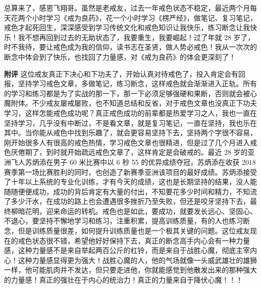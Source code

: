 \begin{case}
    总算来了，感恩飞翔哥。虽然是老戒友，过去一年戒色状态不稳定，最近两个月每天花两个小时学习《戒为良药》，花一个小时学习《楞严经》，做笔记、复习笔记，戒色才起死回生，深深感受到学习传统文化和戒色知识让我快乐，练习断念让我快乐！我不想再回到过去的无助状态了，我要重生，我要崛起！过了年就 28 岁了，时不我待，要让戒色成为我的信仰，读书志在圣贤，做人势必戒色！我从一次次的断念中体会到了快乐，也找回了力量感，对《戒为良药》的体会更深刻了！

    \textbf{附评} 这位戒友真正下决心和下功夫了，开始认真对待戒色了，投入肯定会有回报，坚持学习戒色文章，多做笔记，练习断念，这样戒色就会渐渐进入正轨。所有的学习和练习都是为了实战的那一下，那一下必须足够强硬和果断，否则就会被心魔附体。不少戒友屡戒屡败，也不知道总结和反省，对于戒色文章也没真正下功夫学习，这样怎能戒色成功呢？真正戒色成功的前辈都是热爱学习之人，我也一直在坚持学习，几乎没有中断过，不是看文章，就是复习笔记，一直在坚持，我也乐在其中。当你能从戒色中找到乐趣了，就会更容易坚持下去，坚持两个字很不容易，刚开始很多人有很高的戒色热情，学习戒色文章也很精进，但是过了几个月进入戒色厌倦期了，到时就开始疏远戒色文章了，这样肯定是会破戒的。最近 28 岁的亚洲飞人苏炳添在男子 60 米比赛中以 6 秒 55 的优异成绩夺冠，苏炳添在收获 2018 赛季第一场比赛胜利的同时，也创造了新赛季亚洲该项目的最好成绩。苏炳添接受了十年以上系统的专业化训练，才有今天的成绩，这也是长期坚持的结果，没人能随随便便成功，成功的背后肯定有大量的付出，不知要花多少时间和精力，不知流了多少汗水，在成功的路上也会遭遇很多挫折乃至失败，但还是咬牙坚持下去，最终柳暗花明，迎来命运的转机。戒色也是如此，要成功，就要发长远心、坚固心、不退心，要坚持不懈地学习和练习，注重积累，提高训练质量，有的人也练习断念，但是训练质量很差，如何提升训练质量也是一个极其关键的问题。这位戒友现在的戒色状态很不错，希望他好好保持下去，真正的断念高手内心会有一种力量感，这种力量感不是来自举起两百公斤的杠铃，而是来自于战胜心魔，彻底主宰内心！这种力量感显得更为强大！战胜心魔的人，他的气场就像一头威武雄壮的雄狮一样，他可能肌肉并不发达，但只要走进他，你就能感觉到他散发出来的那种强大的力量感！真正的强壮在于内心的统治力！真正的力量来自于降伏心魔！！！
\end{case}

